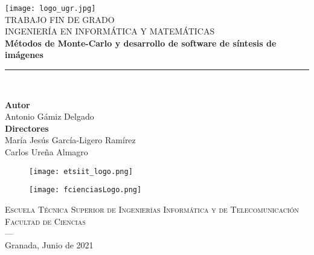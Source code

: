 \begin{titlepage}
 
 
\newlength{\centeroffset}
\setlength{\centeroffset}{-0.5\oddsidemargin}
\addtolength{\centeroffset}{0.5\evensidemargin}
\thispagestyle{empty}

\noindent\hspace*{\centeroffset}\begin{minipage}{\textwidth}

\centering
\texttt{[image: logo\_ugr.jpg]}\\[1.4cm]

\textsc{ \Large TRABAJO FIN DE GRADO\\[0.2cm]}
\textsc{ INGENIERÍA EN INFORMÁTICA Y MATEMÁTICAS}\\[1cm]

{\Huge\bfseries Métodos de Monte-Carlo y desarrollo de software de síntesis de imágenes  \\
}
\noindent\rule[-1ex]{\textwidth}{3pt}\\[3.5ex]
\end{minipage}

\vspace{2.5cm}
\noindent\hspace*{\centeroffset}\begin{minipage}{\textwidth}
\centering

\textbf{Autor}\\ {Antonio Gámiz Delgado}\\[2.5ex]
\textbf{Directores}\\
{María Jesús García-Ligero Ramírez}\\
{Carlos Ureña Almagro}\\[2.5ex]
\begin{figure}[H]
\centering
\begin{minipage}{.5\textwidth}
  \centering
  \texttt{[image: etsiit\_logo.png]}
\end{minipage}%
\begin{minipage}{.5\textwidth}
  \centering
  \texttt{[image: fcienciasLogo.png]}
\end{minipage}
\end{figure}
\textsc{Escuela Técnica Superior de Ingenierías Informática y de Telecomunicación}\\
\textsc{Facultad de Ciencias}\\
\textsc{---}\\
Granada, Junio de 2021
\end{minipage}
\end{titlepage}

